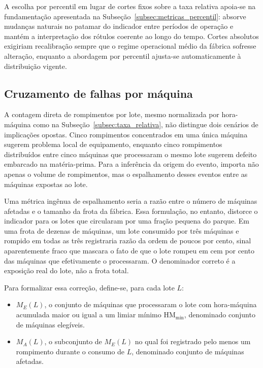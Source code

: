 A escolha por percentil em lugar de cortes fixos sobre a taxa relativa apoia-se na fundamentação apresentada na Subseção~\ref{subsec:metricas_percentil}: absorve mudanças naturais no patamar do indicador entre períodos de operação e mantém a interpretação dos rótulos coerente ao longo do tempo. Cortes absolutos exigiriam recalibração sempre que o regime operacional médio da fábrica sofresse alteração, enquanto a abordagem por percentil ajusta-se automaticamente à distribuição vigente.


\subsection{Cruzamento de falhas por máquina}
\label{subsec:contaminacao_cruzada}

A contagem direta de rompimentos por lote, mesmo normalizada por hora-máquina como na Subseção~\ref{subsec:taxa_relativa}, não distingue dois cenários de implicações opostas. Cinco rompimentos concentrados em uma única máquina sugerem problema local de equipamento, enquanto cinco rompimentos distribuídos entre cinco máquinas que processaram o mesmo lote sugerem defeito embarcado na matéria-prima. Para a inferência da origem do evento, importa não apenas o volume de rompimentos, mas o espalhamento desses eventos entre as máquinas expostas ao lote.

Uma métrica ingênua de espalhamento seria a razão entre o número de máquinas afetadas e o tamanho da frota da fábrica. Essa formulação, no entanto, distorce o indicador para os lotes que circularam por uma fração pequena do parque. Em uma frota de dezenas de máquinas, um lote consumido por três máquinas e rompido em todas as três registraria razão da ordem de poucos por cento, sinal aparentemente fraco que mascara o fato de que o lote rompeu em cem por cento das máquinas que efetivamente o processaram. O denominador correto é a exposição real do lote, não a frota total.

Para formalizar essa correção, define-se, para cada lote $L$:
\begin{itemize}
    \item $M_E(L)$, o conjunto de máquinas que processaram o lote com hora-máquina acumulada maior ou igual a um limiar mínimo $\text{HM}_{\min}$, denominado conjunto de máquinas elegíveis.
    \item $M_A(L)$, o subconjunto de $M_E(L)$ no qual foi registrado pelo menos um rompimento durante o consumo de $L$, denominado conjunto de máquinas afetadas.
\end{itemize}

